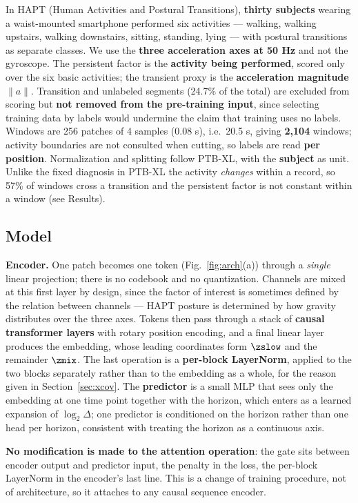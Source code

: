 In HAPT (Human Activities and Postural Transitions), \textbf{thirty subjects} wearing a waist-mounted smartphone performed six activities --- walking, walking upstairs, walking downstairs, sitting, standing, lying --- with postural transitions as separate classes. We use the \textbf{three acceleration axes at 50 Hz} and not the gyroscope. The persistent factor is the \textbf{activity being performed}, scored only over the six basic activities; the transient proxy is the \textbf{acceleration magnitude} $\lVert a\rVert$. Transition and unlabeled segments (24.7\% of the total) are excluded from scoring but \textbf{not removed from the pre-training input}, since selecting training data by labels would undermine the claim that training uses no labels. Windows are 256 patches of 4 samples (0.08 s), i.e.\ 20.5 s, giving \textbf{2,104} windows; activity boundaries are not consulted when cutting, so labels are read \textbf{per position}. Normalization and splitting follow PTB-XL, with the \textbf{subject} as unit. Unlike the fixed diagnosis in PTB-XL the activity \emph{changes} within a record, so 57\% of windows cross a transition and the persistent factor is not constant within a window (see Results).

\subsection{Model}

\textbf{Encoder.} One patch becomes one token (Fig.~\ref{fig:arch}(a)) through a \emph{single} linear projection; there is no codebook and no quantization. Channels are mixed at this first layer by design, since the factor of interest is sometimes defined by the relation between channels --- HAPT posture is determined by how gravity distributes over the three axes. Tokens then pass through a stack of \textbf{causal transformer layers} with rotary position encoding, and a final linear layer produces the embedding, whose leading coordinates form $\zslow$ and the remainder $\zmix$. The last operation is a \textbf{per-block LayerNorm}, applied to the two blocks separately rather than to the embedding as a whole, for the reason given in Section~\ref{sec:xcov}. The \textbf{predictor} is a small MLP that sees only the embedding at one time point together with the horizon, which enters as a learned expansion of $\log_2\Delta$; one predictor is conditioned on the horizon rather than one head per horizon, consistent with treating the horizon as a continuous axis.

\textbf{No modification is made to the attention operation}: the gate sits between encoder output and predictor input, the penalty in the loss, the per-block LayerNorm in the encoder's last line. This is a change of training procedure, not of architecture, so it attaches to any causal sequence encoder.

